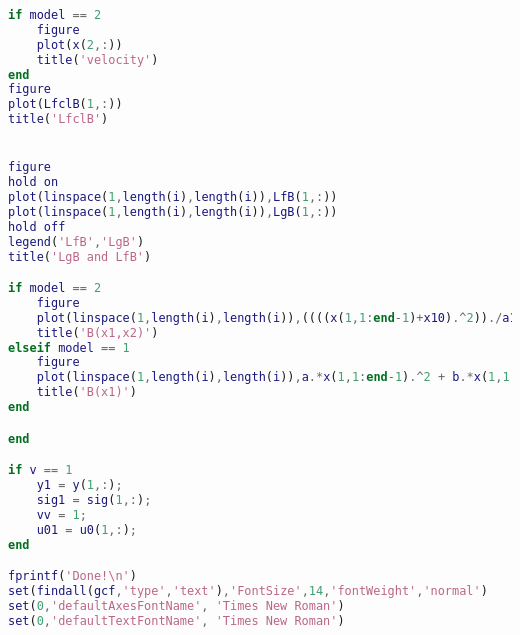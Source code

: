 \begin{lstlisting}[language=matlab]
if model == 2
    figure
    plot(x(2,:))
    title('velocity')
end
figure
plot(LfclB(1,:))
title('LfclB')


figure
hold on
plot(linspace(1,length(i),length(i)),LfB(1,:))
plot(linspace(1,length(i),length(i)),LgB(1,:))
hold off
legend('LfB','LgB')
title('LgB and LfB')

if model == 2
    figure
    plot(linspace(1,length(i),length(i)),((((x(1,1:end-1)+x10).^2))./a1^2 + ((x(2,1:end-1)+x20).^2)./b1^2)*c1 + c2)
    title('B(x1,x2)')
elseif model == 1
    figure
    plot(linspace(1,length(i),length(i)),a.*x(1,1:end-1).^2 + b.*x(1,1:end-1) + c)
    title('B(x1)')
end

end

if v == 1
    y1 = y(1,:);
    sig1 = sig(1,:);
    vv = 1;
    u01 = u0(1,:);
end

fprintf('Done!\n')
set(findall(gcf,'type','text'),'FontSize',14,'fontWeight','normal')
set(0,'defaultAxesFontName', 'Times New Roman')
set(0,'defaultTextFontName', 'Times New Roman')
\end{lstlisting}